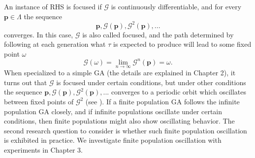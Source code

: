 An instance of RHS is  focused if $\mathcal{G}$ is continuously differentiable, and for every $\bm{p}  \in  \Lambda$
the sequence
\[
\bm{p},  \mathcal{G}(\bm{p}),  {\mathcal{G}}^2(\bm{p}),...
\]
converges. In this case, $\mathcal{G}$ is also called focused, and the path determined by following at each generation what $\tau$ is expected 
to produce will lead to some fixed point $\omega$
\[
\mathcal{G}(\omega) = \lim_{n\to\infty} \mathcal{G}^n(\bm{p}) = \omega.
\]
When specialized to a simple GA (the details are explained in Chapter 2), it turns out that $ \mathcal{G}$ is focused under certain conditions, 
but under other conditions the sequence 
$\bm{p},  \mathcal{G}(\bm{p}),  {\mathcal{G}}^2(\bm{p}),...$ converges 
to a periodic orbit which oscillates between fixed points of $\mathcal{G}^2$ (see \cite{Vose1999}). 
If a finite population GA follows the infinite population GA closely, and if infinite populations oscillate under certain conditions, then 
finite populations might also show oscillating behavior. The second research question to consider is whether such finite population 
oscillation is exhibited in practice. We investigate finite population oscillation with experiments 
in Chapter 3. 


